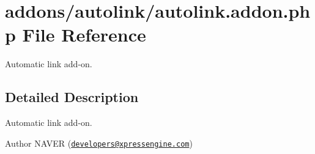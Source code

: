 \hypertarget{autolink_8addon_8php}{}\section{addons/autolink/autolink.addon.\+php File Reference}
\label{autolink_8addon_8php}


Automatic link add-\/on.  




\subsection{Detailed Description}
Automatic link add-\/on. 

\begin{DoxyAuthor}{Author}
N\+A\+V\+E\+R (\href{mailto:developers@xpressengine.com}{\tt developers@xpressengine.\+com}) 
\end{DoxyAuthor}
